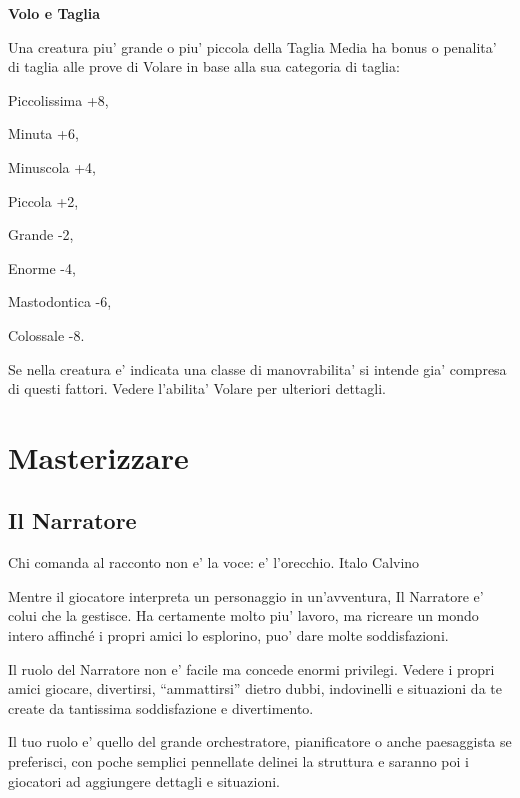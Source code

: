 \documentclass[a4paper,11pt,twoside,openany]{dndbook}
\begin{document}
{\textbf{Volo e Taglia}

Una creatura piu' grande o piu' piccola della Taglia Media ha bonus o penalita' di taglia alle prove di Volare in base alla sua categoria di taglia:

Piccolissima +8,

Minuta +6,

Minuscola +4,

Piccola +2,

Grande -2,

Enorme -4,

Mastodontica -6,

Colossale -8.

Se nella creatura e' indicata una classe di manovrabilita' si intende gia' compresa di questi fattori. Vedere l'abilita' Volare per ulteriori dettagli.

\pagebreak

\section{Masterizzare}

\label{masterizzare}


\subsection{Il Narratore}

\begin{quotebox}
{Chi comanda al racconto non e' la voce: e' l'orecchio. Italo Calvino}
\end{quotebox}


\label{il-narratore}

Mentre il giocatore interpreta un personaggio in un'avventura, Il Narratore e' colui che la gestisce. Ha certamente molto piu' lavoro, ma ricreare un mondo intero affinché i propri amici lo esplorino, puo' dare molte soddisfazioni.

Il ruolo del Narratore non e' facile ma concede enormi privilegi. Vedere i propri amici giocare, divertirsi, ``ammattirsi'' dietro dubbi, indovinelli e situazioni da te create da tantissima soddisfazione e divertimento.

Il tuo ruolo e' quello del grande orchestratore, pianificatore o anche paesaggista se preferisci, con poche semplici pennellate delinei la struttura e saranno poi i giocatori ad aggiungere dettagli e situazioni.



}
\end{document}
